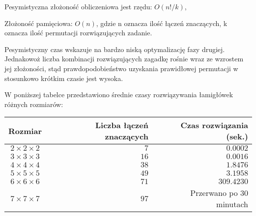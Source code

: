 Pesymistyczna złożoność obliczeniowa jest rzędu: $ O(n!/k) $,

Złożoność pamięciowa: $ O(n) $, gdzie n oznacza ilość łączeń znaczących, k oznacza ilość permutacji rozwiązujących zadanie.

Pesymistyczny czas wskazuje na bardzo niską optymalizację fazy drugiej. Jednakowoż liczba kombinacji rozwiązujących zagadkę rośnie wraz ze wzrostem jej złożoności, stąd prawdopodobieństwo uzyskania prawidłowej permutacji w stosunkowo krótkim czasie jest wysoka.



W poniższej tabelce przedstawiono średnie czasy rozwiązywania łamigłówek różnych rozmiarów:
\begin{center}
\begin{tabular}{|c|r|r|}
\hline
{\bf Rozmiar} & {\bf Liczba łączeń znaczących} & {\bf Czas rozwiązania (sek.)} \\
\hline
\hline
$2\times 2\times 2$ & $7$ & $0.0002$ \\
\hline
$3\times 3\times 3$ & $16$ & $0.0016$ \\
\hline
$4\times 4\times 4$ & $38$ & $1.8476$ \\
\hline
$5\times 5\times 5$ & $49$ & $3.1958$ \\
\hline
$6\times 6\times 6$ & $71$ & $309.4230$ \\
\hline
$7\times 7\times 7$ & $97$ & Przerwano po 30 minutach \\
\hline
\end{tabular}
\end{center}